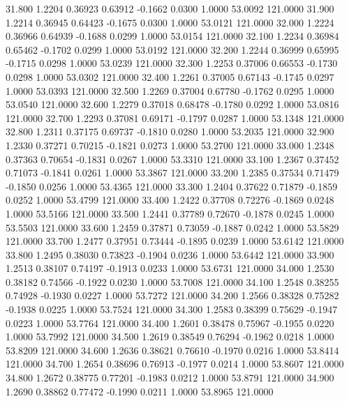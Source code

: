  31.800   1.2204   0.36923   0.63912  -0.1662   0.0300   1.0000  53.0092 121.0000
  31.900   1.2214   0.36945   0.64423  -0.1675   0.0300   1.0000  53.0121 121.0000
  32.000   1.2224   0.36966   0.64939  -0.1688   0.0299   1.0000  53.0154 121.0000
  32.100   1.2234   0.36984   0.65462  -0.1702   0.0299   1.0000  53.0192 121.0000
  32.200   1.2244   0.36999   0.65995  -0.1715   0.0298   1.0000  53.0239 121.0000
  32.300   1.2253   0.37006   0.66553  -0.1730   0.0298   1.0000  53.0302 121.0000
  32.400   1.2261   0.37005   0.67143  -0.1745   0.0297   1.0000  53.0393 121.0000
  32.500   1.2269   0.37004   0.67780  -0.1762   0.0295   1.0000  53.0540 121.0000
  32.600   1.2279   0.37018   0.68478  -0.1780   0.0292   1.0000  53.0816 121.0000
  32.700   1.2293   0.37081   0.69171  -0.1797   0.0287   1.0000  53.1348 121.0000
  32.800   1.2311   0.37175   0.69737  -0.1810   0.0280   1.0000  53.2035 121.0000
  32.900   1.2330   0.37271   0.70215  -0.1821   0.0273   1.0000  53.2700 121.0000
  33.000   1.2348   0.37363   0.70654  -0.1831   0.0267   1.0000  53.3310 121.0000
  33.100   1.2367   0.37452   0.71073  -0.1841   0.0261   1.0000  53.3867 121.0000
  33.200   1.2385   0.37534   0.71479  -0.1850   0.0256   1.0000  53.4365 121.0000
  33.300   1.2404   0.37622   0.71879  -0.1859   0.0252   1.0000  53.4799 121.0000
  33.400   1.2422   0.37708   0.72276  -0.1869   0.0248   1.0000  53.5166 121.0000
  33.500   1.2441   0.37789   0.72670  -0.1878   0.0245   1.0000  53.5503 121.0000
  33.600   1.2459   0.37871   0.73059  -0.1887   0.0242   1.0000  53.5829 121.0000
  33.700   1.2477   0.37951   0.73444  -0.1895   0.0239   1.0000  53.6142 121.0000
  33.800   1.2495   0.38030   0.73823  -0.1904   0.0236   1.0000  53.6442 121.0000
  33.900   1.2513   0.38107   0.74197  -0.1913   0.0233   1.0000  53.6731 121.0000
  34.000   1.2530   0.38182   0.74566  -0.1922   0.0230   1.0000  53.7008 121.0000
  34.100   1.2548   0.38255   0.74928  -0.1930   0.0227   1.0000  53.7272 121.0000
  34.200   1.2566   0.38328   0.75282  -0.1938   0.0225   1.0000  53.7524 121.0000
  34.300   1.2583   0.38399   0.75629  -0.1947   0.0223   1.0000  53.7764 121.0000
  34.400   1.2601   0.38478   0.75967  -0.1955   0.0220   1.0000  53.7992 121.0000
  34.500   1.2619   0.38549   0.76294  -0.1962   0.0218   1.0000  53.8209 121.0000
  34.600   1.2636   0.38621   0.76610  -0.1970   0.0216   1.0000  53.8414 121.0000
  34.700   1.2654   0.38696   0.76913  -0.1977   0.0214   1.0000  53.8607 121.0000
  34.800   1.2672   0.38775   0.77201  -0.1983   0.0212   1.0000  53.8791 121.0000
  34.900   1.2690   0.38862   0.77472  -0.1990   0.0211   1.0000  53.8965 121.0000
